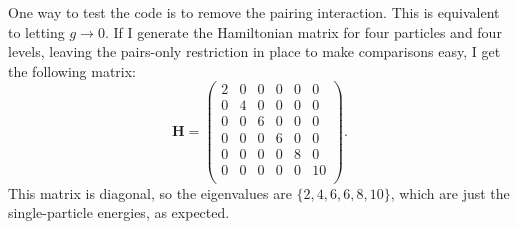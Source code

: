 \documentclass{article}
\begin{document}
	One way to test the code is to remove the pairing interaction. This is equivalent to letting $g \rightarrow 0$. If I generate the Hamiltonian matrix for four particles and four levels, leaving the pairs-only restriction in place to make comparisons easy, I get the following matrix:
	\begin{equation*}
		\mathbf{H} = \begin{pmatrix}
			2 & 0 & 0 & 0 & 0 & 0  \\
			0 & 4 & 0 & 0 & 0 & 0  \\
			0 & 0 & 6 & 0 & 0 & 0  \\
			0 & 0 & 0 & 6 & 0 & 0  \\
			0 & 0 & 0 & 0 & 8 & 0  \\
			0 & 0 & 0 & 0 & 0 & 10 \\
		\end{pmatrix}.
	\end{equation*}
	This matrix is diagonal, so the eigenvalues are $\{2, 4, 6, 6, 8, 10\}$, which are just the single-particle energies, as expected.
\end{document}
